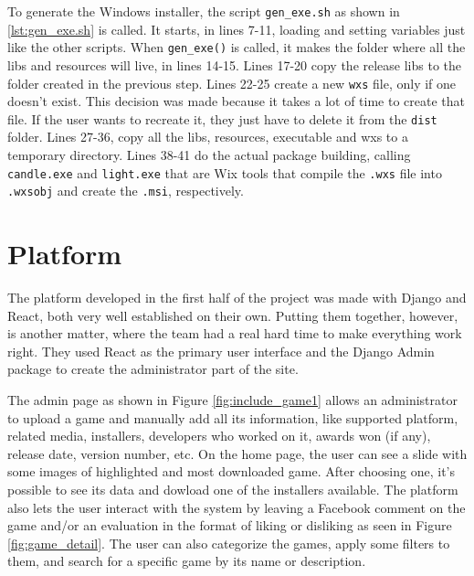 

To generate the Windows installer, the script \texttt{gen\_exe.sh} as shown in \ref{lst:gen_exe.sh} is called. It starts, in lines 7-11, loading and setting variables just like the other scripts. When \texttt{gen\_exe()} is called, it makes the folder where all the libs and resources will live, in lines 14-15. Lines 17-20 copy the release libs to the folder created in the previous step. Lines 22-25 create a new \texttt{wxs} file, only if one doesn't exist. This decision was made because it takes a lot of time to create that file. If the user wants to recreate it, they just have to delete it from the \texttt{dist} folder. Lines 27-36, copy all the libs, resources, executable and wxs to a temporary directory. Lines 38-41 do the actual package building, calling \texttt{candle.exe} and \texttt{light.exe} that are Wix tools that compile the \texttt{.wxs} file into \texttt{.wxsobj} and create the \texttt{.msi}, respectively.



\section{Platform}
\label {sec:platform}

The platform developed in the first half of the project was made with Django and React, both very well established on their own. Putting them together, however, is another matter, where the team had a real hard time to make everything work right. They used React as the primary user interface and the Django Admin package to create the administrator part of the site.

The admin page as shown in Figure \ref{fig:include_game1} allows an administrator to upload a game and manually add all its information, like supported platform, related media, installers, developers who worked on it, awards won (if any), release date, version number, etc. On the home page, the user can see a slide with some images of highlighted and most downloaded game. After choosing one, it's possible to see its data and dowload one of the installers available. The platform also lets the user interact with the system by leaving a Facebook comment on the game and/or an evaluation in the format of liking or disliking as seen in Figure \ref{fig:game_detail}. The user can also categorize the games, apply some filters to them, and search for a specific game by its name or description.

